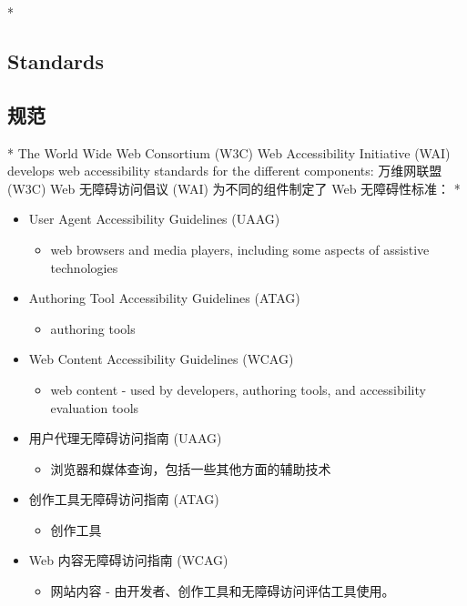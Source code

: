 \begin{paracol}{2} 
 
\switchcolumn[0]*%
\subsection{Standards}
\switchcolumn
\subsection{规范}
\switchcolumn[0]*%
The World Wide Web Consortium (W3C) Web Accessibility Initiative (WAI)
develops web accessibility standards for the different components:
\switchcolumn
万维网联盟 (W3C) Web 无障碍访问倡议 (WAI) 为不同的组件制定了 Web
无障碍性标准：
\switchcolumn[0]*%
\begin{itemize}
\item
  User Agent Accessibility Guidelines (UAAG)
  \begin{itemize}
  \item
    web browsers and media players, including some aspects of assistive
    technologies
  \end{itemize}
\item
  Authoring Tool Accessibility Guidelines (ATAG)
  \begin{itemize}
  \item
    authoring tools
  \end{itemize}
\item
  Web Content Accessibility Guidelines (WCAG)
  \begin{itemize}
  \item
    web content - used by developers, authoring tools, and accessibility
    evaluation tools
  \end{itemize}
\end{itemize}
\switchcolumn
\begin{itemize}
\item
  用户代理无障碍访问指南 (UAAG)
  \begin{itemize}
  \item
    浏览器和媒体查询，包括一些其他方面的辅助技术
  \end{itemize}
\item
  创作工具无障碍访问指南 (ATAG)
  \begin{itemize}
  \item
    创作工具
  \end{itemize}
\item
  Web 内容无障碍访问指南 (WCAG)
  \begin{itemize}
  \item
    网站内容 - 由开发者、创作工具和无障碍访问评估工具使用。
  \end{itemize}
\end{itemize}
\end{paracol}



